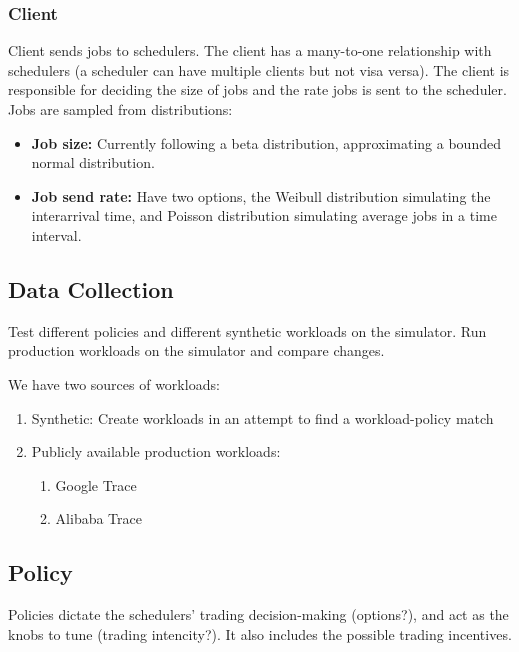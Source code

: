 \subsubsection{Client}
Client sends jobs to schedulers. The client has a many-to-one relationship with schedulers
(a scheduler can have multiple clients but not visa versa).
The client is responsible for deciding the size of jobs and the rate jobs is sent to the scheduler.
Jobs are sampled from distributions:
\begin{itemize}
    \item \textbf{Job size:} Currently following a beta distribution, approximating a bounded normal distribution. 
    \item \textbf{Job send rate:} Have two options, the Weibull distribution simulating the interarrival time, and 
    Poisson distribution simulating average jobs in a time interval.
\end{itemize}
\subsection{Data Collection}
Test different policies and different synthetic workloads on the simulator. 
Run production workloads on the simulator and compare changes.

We have two sources of workloads:
\begin{enumerate}
    \item Synthetic: Create workloads in an attempt to find a workload-policy match
    \item Publicly available production workloads:
        \begin{enumerate}
            \item Google Trace %
            \item Alibaba Trace %
        \end{enumerate}
\end{enumerate}

\subsection{Policy}
Policies dictate the schedulers' trading decision-making (options?), and 
act as the knobs to tune (trading intencity?). It also includes the possible trading incentives.

